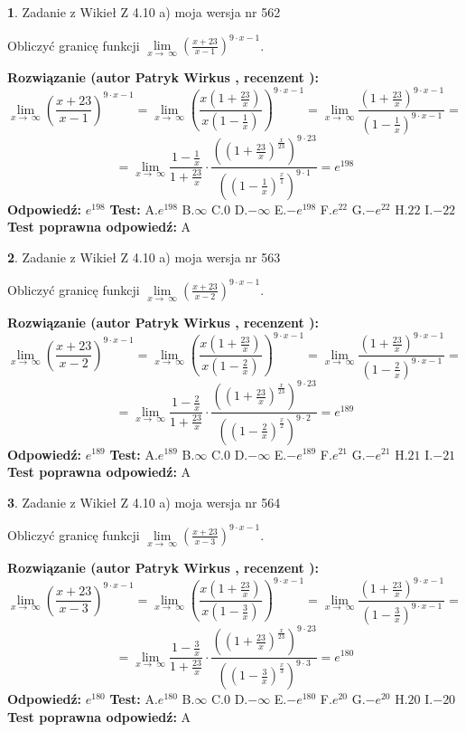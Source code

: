 \documentclass[12pt, a4paper]{article}
\theoremstyle{definition} %
\newtheorem{zad}{}
\newcommand{\zadStart}[1]{\begin{zad}#1\newline}
\newcommand{\zadStop}{\end{zad}}
\newcommand{\rozwStart}[2]{\noindent \textbf{Rozwiązanie (autor #1 , recenzent #2): }\newline}
\newcommand{\rozwStop}{\newline}
\newcommand{\odpStart}{\noindent \textbf{Odpowiedź:}\newline}
\newcommand{\odpStop}{\newline}
\newcommand{\testStart}{\noindent \textbf{Test:}\newline}
\newcommand{\testStop}{\newline}
\newcommand{\kluczStart}{\noindent \textbf{Test poprawna odpowiedź:}\newline}
\newcommand{\kluczStop}{\newline}
\begin{document}
\zadStart{Zadanie z Wikieł Z 4.10 a) moja wersja nr 562}

Obliczyć granicę funkcji  $\lim\limits_{x\to\ \infty}(\frac{x+23}{x-1})^{9\cdot x-1}$.
\zadStop
\rozwStart{Patryk Wirkus}{}
$$\lim\limits_{x\to\ \infty}(\frac{x+23}{x-1})^{9\cdot x-1} = \lim\limits_{x\to\ \infty}(\frac{x(1+\frac{23}{x})}{x(1-\frac{1}{x})})^{9\cdot x-1}=\lim\limits_{x\to\ \infty}\frac{(1+\frac{23}{x})^{9\cdot x-1}}{(1-\frac{1}{x})^{9\cdot x-1}}=$$
$$=\lim\limits_{x\to\ \infty}\frac{1-\frac{1}{x}}{1+\frac{23}{x}}\cdot\frac{((1+\frac{23}{x})^{\frac{x}{23}})^{9\cdot23}}{((1-\frac{1}{x})^{\frac{x}{1}})^{9\cdot1}}=e^{198}$$
\rozwStop
\odpStart
$e^{198}$
\odpStop
\testStart
A.$e^{198}$ B.$\infty$ C.$0$ D.$-\infty$ E.$-e^{198}$
F.$e^{22}$ G.$-e^{22}$
H.$22$
I.$-22$
\testStop
\kluczStart
A
\kluczStop



\zadStart{Zadanie z Wikieł Z 4.10 a) moja wersja nr 563}

Obliczyć granicę funkcji  $\lim\limits_{x\to\ \infty}(\frac{x+23}{x-2})^{9\cdot x-1}$.
\zadStop
\rozwStart{Patryk Wirkus}{}
$$\lim\limits_{x\to\ \infty}(\frac{x+23}{x-2})^{9\cdot x-1} = \lim\limits_{x\to\ \infty}(\frac{x(1+\frac{23}{x})}{x(1-\frac{2}{x})})^{9\cdot x-1}=\lim\limits_{x\to\ \infty}\frac{(1+\frac{23}{x})^{9\cdot x-1}}{(1-\frac{2}{x})^{9\cdot x-1}}=$$
$$=\lim\limits_{x\to\ \infty}\frac{1-\frac{2}{x}}{1+\frac{23}{x}}\cdot\frac{((1+\frac{23}{x})^{\frac{x}{23}})^{9\cdot23}}{((1-\frac{2}{x})^{\frac{x}{2}})^{9\cdot2}}=e^{189}$$
\rozwStop
\odpStart
$e^{189}$
\odpStop
\testStart
A.$e^{189}$ B.$\infty$ C.$0$ D.$-\infty$ E.$-e^{189}$
F.$e^{21}$ G.$-e^{21}$
H.$21$
I.$-21$
\testStop
\kluczStart
A
\kluczStop



\zadStart{Zadanie z Wikieł Z 4.10 a) moja wersja nr 564}

Obliczyć granicę funkcji  $\lim\limits_{x\to\ \infty}(\frac{x+23}{x-3})^{9\cdot x-1}$.
\zadStop
\rozwStart{Patryk Wirkus}{}
$$\lim\limits_{x\to\ \infty}(\frac{x+23}{x-3})^{9\cdot x-1} = \lim\limits_{x\to\ \infty}(\frac{x(1+\frac{23}{x})}{x(1-\frac{3}{x})})^{9\cdot x-1}=\lim\limits_{x\to\ \infty}\frac{(1+\frac{23}{x})^{9\cdot x-1}}{(1-\frac{3}{x})^{9\cdot x-1}}=$$
$$=\lim\limits_{x\to\ \infty}\frac{1-\frac{3}{x}}{1+\frac{23}{x}}\cdot\frac{((1+\frac{23}{x})^{\frac{x}{23}})^{9\cdot23}}{((1-\frac{3}{x})^{\frac{x}{3}})^{9\cdot3}}=e^{180}$$
\rozwStop
\odpStart
$e^{180}$
\odpStop
\testStart
A.$e^{180}$ B.$\infty$ C.$0$ D.$-\infty$ E.$-e^{180}$
F.$e^{20}$ G.$-e^{20}$
H.$20$
I.$-20$
\testStop
\kluczStart
A
\kluczStop
\end{document}

